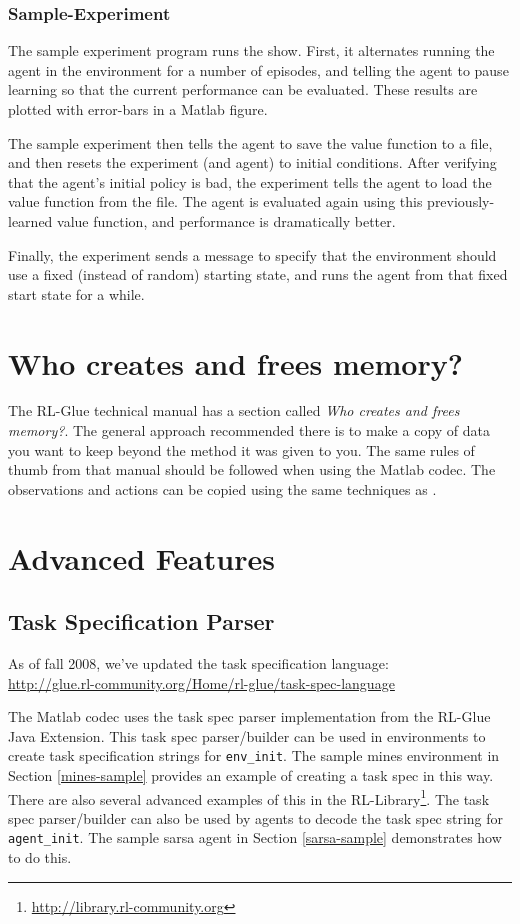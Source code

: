 \documentclass[11pt]{article}
\begin{document}
\subsubsection{Sample-Experiment}
The sample experiment program runs the show.  First, it alternates running the agent in the environment for a number of episodes, and telling the agent to pause learning so that the current performance can be evaluated.  These results are plotted with error-bars in a Matlab figure.

The sample experiment then tells the agent to save the value function to a file, and then resets the experiment (and agent) to initial conditions.  After verifying that the agent's initial policy is bad, the experiment tells the agent to load the value function from the file.  The agent is evaluated again using this previously-learned value function, and performance is dramatically better.

Finally, the experiment sends a message to specify that the environment should use a fixed (instead of random) starting state, and runs the agent from that fixed start state for a while.

\section{Who creates and frees memory?}
The RL-Glue technical manual has a section called \textit{Who creates and frees memory?}.  The general approach recommended there is to make a copy of data you want to keep beyond the method it was given to you.  The same rules of thumb from that manual should be followed when using the Matlab codec.  The observations and actions can be copied using the same techniques as .


\section{Advanced Features}
\subsection{Task Specification Parser}
As of fall 2008, we've updated the task specification language:\\
\url{http://glue.rl-community.org/Home/rl-glue/task-spec-language}

The Matlab codec uses the task spec parser implementation from the RL-Glue Java Extension.  This task spec parser/builder can be used in environments to create task specification strings for \texttt{env\_init}.  The sample mines environment in Section \ref{mines-sample} provides an example of creating a task spec in this way.  There are also several advanced examples of this in the RL-Library\footnote{\url{http://library.rl-community.org}}.  The task spec parser/builder can also be used by agents to decode the task spec string for \texttt{agent\_init}.  The sample sarsa agent in Section \ref{sarsa-sample} demonstrates how to do this.
\end{document}
